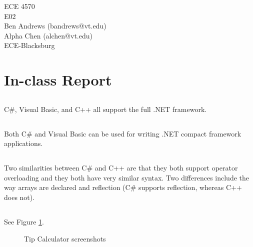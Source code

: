 \documentclass[11pt]{article}
\begin{document}
\begin{flushright}
{ECE 4570}\\{E02}\\{Ben Andrews (bandrews@vt.edu)}\\{Alpha Chen (alchen@vt.edu)}\\{ECE-Blacksburg}\end{flushright}

\section{In-class Report}

\subsection{}

C\#, Visual Basic, and C++ all support the full .NET framework.

\subsection{}

Both C\# and Visual Basic can be used for writing .NET compact framework applications.

\subsection{}

Two similarities between C\# and C++ are that they both support operator overloading and they both have very similar syntax. Two differences include the way arrays are declared and reflection (C\# supports reflection, whereas C++ does not).

\subsection{}

See Figure \ref{tip-screens}.

\begin{figure}[p]
	\centering
	\caption{Tip Calculator screenshots}
	\label{tip-screens}
\end{figure}
\end{document}
